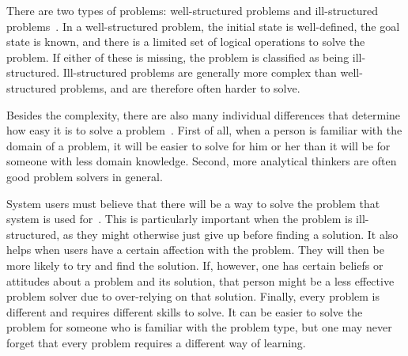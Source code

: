 There are two types of problems: well-structured problems and ill-structured problems~\cite{jonassen2000toward}. In a well-structured problem, the initial state is well-defined, the goal state is known, and there is a limited set of logical operations to solve the problem. If either of these is missing, the problem is classified as being ill-structured. Ill-structured problems are generally more complex than well-structured problems, and are therefore often harder to solve.

Besides the complexity, there are also many individual differences that determine how easy it is to solve a problem~\cite{jonassen2000toward}. First of all, when a person is familiar with the domain of a problem, it will be easier to solve for him or her than it will be for someone with less domain knowledge. Second, more analytical thinkers are often good problem solvers in general.

System users must believe that there will be a way to solve the problem that system is used for~\cite{jonassen2000toward}. This is particularly important when the problem is ill-structured, as they might otherwise just give up before finding a solution. It also helps when users have a certain affection with the problem. They will then be more likely to try and find the solution. If, however, one has certain beliefs or attitudes about a problem and its solution, that person might be a less effective problem solver due to over-relying on that solution. Finally, every problem is different and requires different skills to solve. It can be easier to solve the problem for someone who is familiar with the problem type, but one may never forget that every problem requires a different way of learning.


